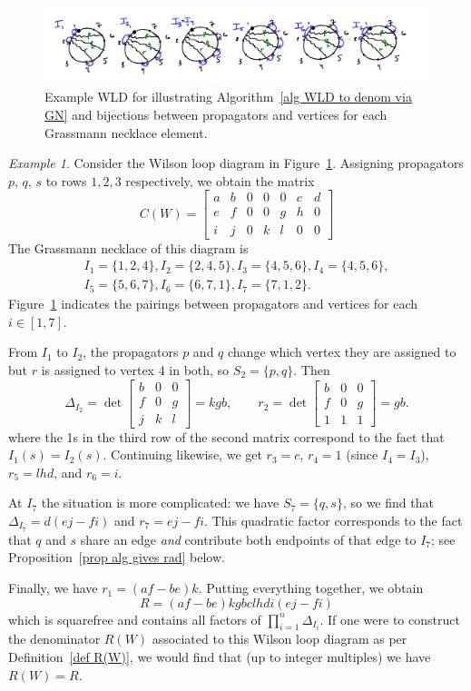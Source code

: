 \documentclass[11pt]{article}
\theoremstyle{remark}
\newtheorem{eg}[thm]{Example}
\theoremstyle{definition}
\begin{document}
\begin{figure}
\includegraphics{egWLD_forR}
\caption{Example WLD for illustrating Algorithm~\ref{alg WLD to denom via GN} and bijections between propagators and vertices for each Grassmann necklace element.}\label{fig R eg}
\end{figure}

\begin{eg}
Consider the Wilson loop diagram in Figure~\ref{fig R eg}. Assigning propagators $p$, $q$, $s$ to rows $1,2,3$ respectively, we obtain the matrix
\[
C(W) = \begin{bmatrix} a & b & 0 & 0 & 0 & c & d \\ e & f & 0 & 0 & g & h & 0 \\ i & j & 0 & k & l & 0 & 0 \end{bmatrix}
\]
The Grassmann necklace of this diagram is 
\begin{gather*}I_1 = \{1,2,4\}, I_2 = \{2,4,5\}, I_3 = \{4,5,6\}, I_4=\{4,5,6\},\\ I_5=\{5,6,7\}, I_6 = \{6,7,1\}, I_7=\{7,1,2\}. \end{gather*}  
Figure~\ref{fig R eg} indicates the pairings between propagators and vertices for each $i \in [1,7]$.  

From $I_1$ to $I_2$, the propagators $p$ and $q$ change which vertex they are assigned to but $r$ is assigned to vertex 4 in both, so $S_2 = \{p,q\}$.  Then
\[
\Delta_{I_2}=\det\begin{bmatrix} b & 0 & 0 \\ f & 0 & g \\ j & k & l \end{bmatrix} = kgb, \qquad r_2 = \det\begin{bmatrix} b & 0 & 0 \\ f & 0 & g \\ 1 & 1 & 1 \end{bmatrix} = gb.
\]
where the 1s in the third row of the second matrix correspond to the fact that $I_1(s) = I_2(s)$.  Continuing likewise, we get $r_3 = c$, $r_4=1$ (since $I_4 = I_3$), $r_5 = lhd$, and $r_6 = i$.

At $I_7$ the situation is more complicated: we have $S_7 = \{q,s\}$, so we find that $\Delta_{I_7} = d(ej-fi)$ and $r_7 = ej-fi$. This quadratic factor corresponds to the fact that $q$ and $s$ share an edge {\em and} contribute both endpoints of that edge to $I_7$; see Proposition~\ref{prop alg gives rad} below.  

Finally, we have $r_1 = (af-be)k$.  Putting everything together, we obtain
\[
R = (af-be)kgbclhdi(ej-fi)
\]
which is squarefree and contains all factors of $\prod_{i=1}^{n}\Delta_{I_i}$. If one were to construct the denominator $R(W)$ associated to this Wilson loop diagram as per Definition~\ref{def R(W)}, we would find that (up to integer multiples) we have $R(W) = R$.
\end{eg}
\end{document}
